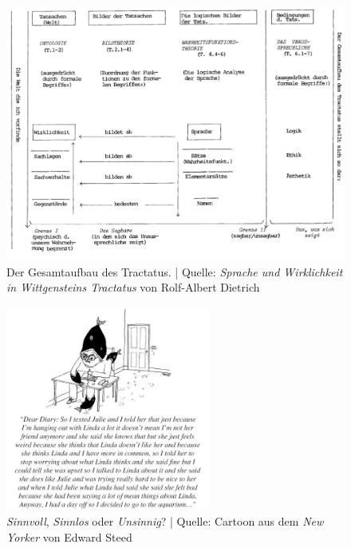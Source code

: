 \documentclass[]{scrartcl}
\begin{document}
\begin{figure}[h]
	\centering
	\includegraphics[width=1\textwidth]{images/tractatus/tractatus-structur.png}
	\caption{Der Gesamtaufbau des Tractatus. | Quelle: \emph{Sprache und Wirklichkeit in Wittgensteins Tractatus} von Rolf-Albert Dietrich}
	\label{fig:struct}
\end{figure}
\begin{figure}[h]
	\centering
	\includegraphics[width=0.6\textwidth]{images/tractatus/newyorker}
	\caption{\emph{Sinnvoll}, \emph{Sinnlos} oder \emph{Unsinnig}? | Quelle: Cartoon aus dem \emph{New Yorker} von Edward Steed}
	\label{fig:newyorker}
\end{figure}


%
%
%


\end{document}
